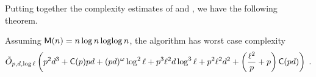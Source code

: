 Putting together the complexity estimates of \ctwoas{} and \ctwoasfi{}, we
have the following theorem.

\begin{theorem}
  \label{th:complexity}
  Assuming $\mathsf{M}(n) = n\log n\operatorname{loglog} n$, the algorithm \ctwoasfi{} has
  worst case complexity
  \begin{equation*}
    \tilde{O}_{p,d,\log\ell}\left(
      p^2d^3 +
      \mathsf{C}(p)pd +
      (pd)^\omega\log^2\ell +
      p^3\ell^2 d\log^3\ell + 
      p^2\ell^2 d^2+
      \left(\frac{\ell^2}{p} + p\right)\mathsf{C}(pd)
    \right)
    \;\text{.}
  \end{equation*}
\end{theorem}



%
